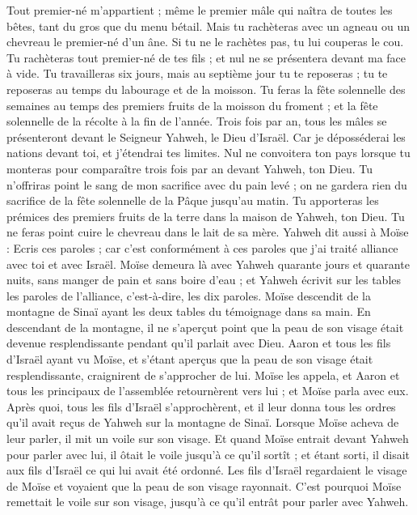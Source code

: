 \begin{multicols}{2}
Tout premier-né m’appartient ; même le premier mâle qui naîtra de toutes les bêtes, tant du gros que du menu bétail.
Mais tu rachèteras avec un agneau ou un chevreau le premier-né d'un âne. Si tu ne le rachètes pas, tu lui couperas le cou. Tu rachèteras tout premier-né de tes fils ; et nul ne se présentera devant ma face à vide.
Tu travailleras six jours, mais au septième jour tu te reposeras ; tu te reposeras au temps du labourage et de la moisson.
Tu feras la fête solennelle des semaines au temps des premiers fruits de la moisson du froment ; et la fête solennelle de la récolte à la fin de l'année.
Trois fois par an, tous les mâles se présenteront devant le Seigneur Yahweh, le Dieu d'Israël.
Car je déposséderai les nations devant toi, et j'étendrai tes limites. Nul ne convoitera ton pays lorsque tu monteras pour comparaître trois fois par an devant Yahweh, ton Dieu.
Tu n'offriras point le sang de mon sacrifice avec du pain levé ; on ne gardera rien du sacrifice de la fête solennelle de la Pâque jusqu’au matin.
Tu apporteras les prémices des premiers fruits de la terre dans la maison de Yahweh, ton Dieu. Tu ne feras point cuire le chevreau dans le lait de sa mère.
Yahweh dit aussi à Moïse : Ecris ces paroles ; car c’est conformément à ces paroles que j'ai traité alliance avec toi et avec Israël.
Moïse demeura là avec Yahweh quarante jours et quarante nuits, sans manger de pain et sans boire d'eau ; et Yahweh écrivit sur les tables les paroles de l'alliance, c'est-à-dire, les dix paroles.
Moïse descendit de la montagne de Sinaï ayant les deux tables du témoignage dans sa main. En descendant de la montagne, il ne s'aperçut point que la peau de son visage était devenue resplendissante pendant qu'il parlait avec Dieu.
Aaron et tous les fils d'Israël ayant vu Moïse, et s'étant aperçus que la peau de son visage était resplendissante, craignirent de s’approcher de lui.
Moïse les appela, et Aaron et tous les principaux de l'assemblée retournèrent vers lui ; et Moïse parla avec eux.
Après quoi, tous les fils d'Israël s'approchèrent, et il leur donna tous les ordres qu’il avait reçus de Yahweh sur la montagne de Sinaï.
Lorsque Moïse acheva de leur parler, il mit un voile sur son visage.
Et quand Moïse entrait devant Yahweh pour parler avec lui, il ôtait le voile jusqu’à ce qu'il sortît ; et étant sorti, il disait aux fils d'Israël ce qui lui avait été ordonné.
Les fils d'Israël regardaient le visage de Moïse et voyaient que la peau de son visage rayonnait. C'est pourquoi Moïse remettait le voile sur son visage, jusqu’à ce qu'il entrât pour parler avec Yahweh.

\end{multicols}
